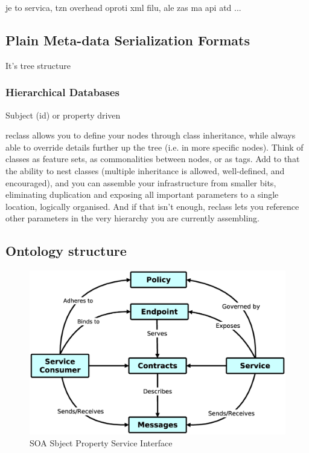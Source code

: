 
je to servica, tzn overhead oproti xml filu, ale zas ma api atd ...

\subsection{Plain Meta-data Serialization Formats}

It's tree structure

\subsubsection{Hierarchical Databases}

Subject (id) or property driven

reclass allows you to define your nodes through class inheritance, while always able to override details further up the tree (i.e. in more specific nodes). Think of classes as feature sets, as commonalities between nodes, or as tags. Add to that the ability to nest classes (multiple inheritance is allowed, well-defined, and encouraged), and you can assemble your infrastructure from smaller bits, eliminating duplication and exposing all important parameters to a single location, logically organised. And if that isn’t enough, reclass lets you reference other parameters in the very hierarchy you are currently assembling.


\subsection{Ontology structure}

\begin{figure}[!h]
\centering
\includegraphics[scale=.2]{img/soa_relation.eps}
\caption{SOA Sbject Property Service Interface}
\label{fig:cm}
\end{figure}





